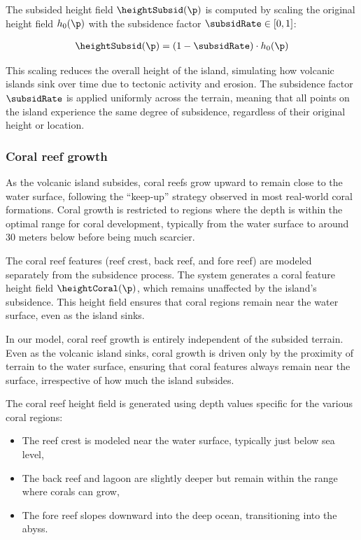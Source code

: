 The subsided height field $\heightSubsid(\p)$ is computed by scaling the original height field $h_0(\p)$ with the subsidence factor $\subsidRate \in [0, 1]$:

\begin{align}
    \heightSubsid(\p) = (1 - \subsidRate) \cdot h_0(\p)
\end{align}

This scaling reduces the overall height of the island, simulating how volcanic islands sink over time due to tectonic activity and erosion. The subsidence factor $\subsidRate$ is applied uniformly across the terrain, meaning that all points on the island experience the same degree of subsidence, regardless of their original height or location.

\subsubsection{Coral reef growth}

As the volcanic island subsides, coral reefs grow upward to remain close to the water surface, following the “keep-up” strategy observed in most real-world coral formations. Coral growth is restricted to regions where the depth is within the optimal range for coral development, typically from the water surface to around 30 meters below before being much scarcier.

The coral reef features (reef crest, back reef, and fore reef) are modeled separately from the subsidence process. The system generates a coral feature height field $\heightCoral(\p)$, which remains unaffected by the island's subsidence. This height field ensures that coral regions remain near the water surface, even as the island sinks.

In our model, coral reef growth is entirely independent of the subsided terrain. Even as the volcanic island sinks, coral growth is driven only by the proximity of terrain to the water surface, ensuring that coral features always remain near the surface, irrespective of how much the island subsides.

The coral reef height field is generated using depth values specific for the various coral regions:
\begin{itemize}
    \item The reef crest is modeled near the water surface, typically just below sea level,
    \item The back reef and lagoon are slightly deeper but remain within the range where corals can grow,
    \item The fore reef slopes downward into the deep ocean, transitioning into the abyss.
\end{itemize}

